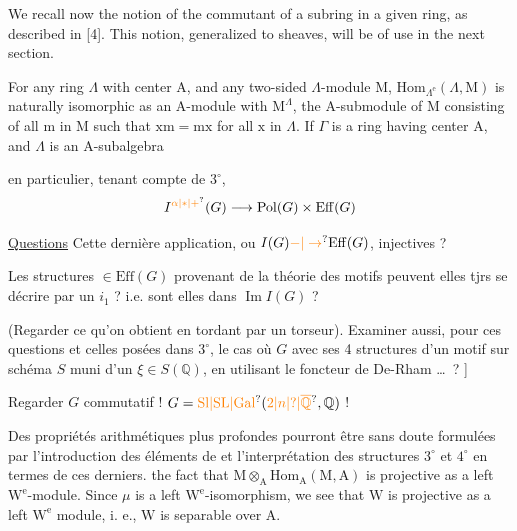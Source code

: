 We recall now the notion of the commutant of a subring in a given ring, as described in [4]. This notion, generalized to sheaves, will be of use in the next section.

For any ring $\Lambda$ with center $\mathrm A$, and any two-sided $\Lambda$-module $\mathrm M$, $\mathrm{Hom}_{\Lambda^{\mathrm e}}(\Lambda,\mathrm M)$ is naturally isomorphic as an $\mathrm A$-module with $\mathrm M^\Lambda$, the $\mathrm A$-submodule of $\mathrm M$ consisting of all $\mathrm m$ in $\mathrm M$ such that $\mathrm{xm}=\mathrm{mx}$ for all $\mathrm x$ in $\Lambda$. If $\Gamma$ is a ring having center $\mathrm A$, and $\Lambda$ is an $\mathrm A$-subalgebra

en particulier, tenant compte de $3^\circ$,
\[
I^{\unsure{\alpha|*|+}}(G)\longrightarrow \mathrm{Pol}(G)\times\mathrm{Eff}(G)
\]

\uline{Questions} Cette dernière application, ou $I(G)\unsure{-|\to}\mathrm{Eff}(G)$, injectives ?

Les structures $\in\mathrm{Eff}(G)$ provenant de la théorie des motifs peuvent elles tjrs se décrire par un $i_1$ ? i.e. sont elles dans $\operatorname{Im}I(G)$ ?

(Regarder ce qu'on obtient en tordant par un torseur). Examiner aussi, pour ces questions et celles posées dans $3^\circ$, le cas où $G$ avec ses 4 structures  d'un motif sur schéma  $S$ muni d'un $\xi\in S(\mathbb{Q})$, en utilisant le foncteur de De-Rham \ldots\ ? ]

Regarder $G$ commutatif ! $G=\unsure{\mathrm{Sl}|\mathrm{SL}|\mathrm{Gal}}(\unsure{2|n|?|\overline{\mathbb Q}},\mathbb{Q})$ !

Des propriétés arithmétiques plus profondes pourront être sans doute formulées par l'introduction des éléments de  et l'interprétation des structures $3^\circ$ et $4^\circ$ en termes de ces derniers.
the fact that $\mathrm M\otimes_{\mathrm A}\mathrm{Hom}_{\mathrm A}(\mathrm M,\mathrm A)$ is projective as a left $\mathrm W^{\mathrm e}$-module. Since $\mu$ is a left $\mathrm W^{\mathrm e}$-isomorphism, we see that $\mathrm W$ is projective as a left $\mathrm W^{\mathrm e}$ module, i. e., $\mathrm W$ is separable over $\mathrm A$.

